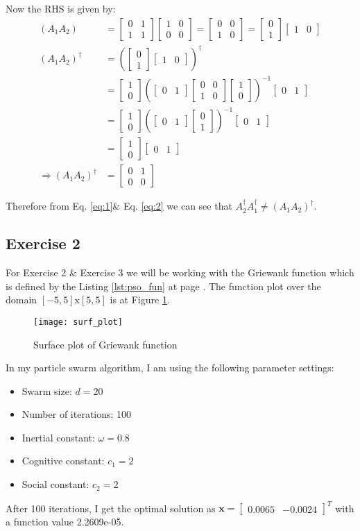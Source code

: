 \documentclass[11pt]{article}
\newcommand{\V}[1]{\pmb{#1}}
\newcommand{\mat}[1]{\begin{bmatrix}#1\end{bmatrix}}
\newcommand{\refEq}[1]{Eq. \ref{#1}}
\newcommand{\reflst}[1]{Listing \ref{#1} at page \pageref{#1}}
\newcommand{\reffig}[1]{Figure \ref{#1}}
\begin{document}
Now the RHS is given by:
\begin{align}
 (A_1A_2) &= \mat{ 0 & 1\\ 1& 1}\mat{1 & 0\\ 0& 0} = \mat{0 & 0\\ 1 & 0} = \mat{0 \\1}\mat{1 &0 } \nonumber\\
 (A_1A_2)^{\dagger} &=  (\mat{0 \\1}\mat{1 &0 })^{\dagger} \nonumber\\
 & = \mat{1 \\0} \left( \mat{0 & 1} \mat{0 & 0\\ 1 & 0} \mat{1 \\0}\right)^{-1} \mat{0 &1} \nonumber\\
 & = \mat{1 \\0} \left( \mat{0 & 1} \mat{0 \\1}\right)^{-1} \mat{0 &1} \nonumber\\
 & = \mat{1 \\0} \mat{0 &1} \nonumber\\
 \Rightarrow (A_1A_2)^{\dagger} &= \mat{0 & 1\\ 0 & 0} \label{eq:2}
\end{align}

Therefore from \refEq{eq:1}\& \refEq{eq:2} we can see that $A_2^{\dagger}A_1^{\dagger} \neq (A_1A_2)^{\dagger}$.

%
\newpage
\vspace{2ex}
%
\subsection*{Exercise 2} 

For Exercise 2 \& Exercise 3 we will be working with the Griewank function which is defined by the \reflst{lst:pso_fun}. The function plot over the domain $[-5,5]\text{x}[5,5]$ is at \reffig{fig:pso_fun}.

\begin{figure}[!h]
 \centering
 \texttt{[image: surf\_plot]}
 \caption{Surface plot of Griewank function}
 \label{fig:pso_fun}
\end{figure}

In my particle swarm algorithm, I am using the following parameter settings:
\begin{itemize}
 \item Swarm size: $d=20$
 \item Number of iterations: 100
 \item Inertial constant: $\omega = 0.8$
 \item Cognitive constant: $c_1 = 2$
 \item Social constant: $c_2 = 2$
\end{itemize}
After 100 iterations, I get the optimal solution as $\V{x}=\mat{0.0065 & -0.0024}^T$ with a function value 2.2609e-05.
\end{document}
